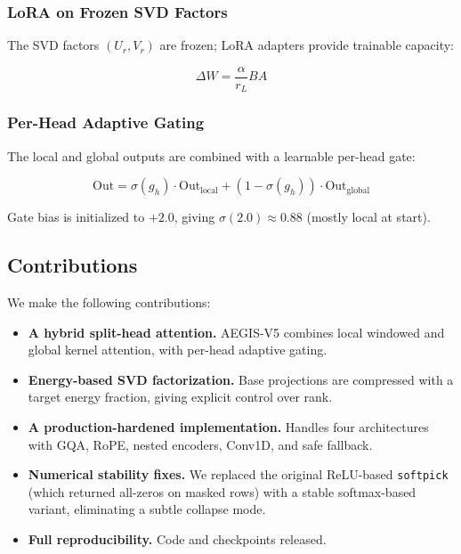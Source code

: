 \subsubsection{LoRA on Frozen SVD Factors}

The SVD factors $(U_r, V_r)$ are frozen; LoRA adapters provide trainable 
capacity:

\begin{equation}
\Delta W = \frac{\alpha}{r_L} B A
\end{equation}

\subsubsection{Per-Head Adaptive Gating}

The local and global outputs are combined with a learnable per-head gate:

\begin{equation}
\text{Out} = \sigma(g_h) \cdot \text{Out}_\text{local} + (1 - \sigma(g_h)) \cdot \text{Out}_\text{global}
\end{equation}

Gate bias is initialized to $+2.0$, giving $\sigma(2.0) \approx 0.88$ 
(mostly local at start).

\subsection{Contributions}

We make the following contributions:

\begin{itemize}
\item \textbf{A hybrid split-head attention.} AEGIS-V5 combines local windowed and
  global kernel attention, with per-head adaptive gating.
\item \textbf{Energy-based SVD factorization.} Base projections are compressed with
  a target energy fraction, giving explicit control over rank.
\item \textbf{A production-hardened implementation.} Handles four architectures with
  GQA, RoPE, nested encoders, Conv1D, and safe fallback.
\item \textbf{Numerical stability fixes.} We replaced the original ReLU-based \texttt{softpick}
  (which returned all-zeros on masked rows) with a stable softmax-based
  variant, eliminating a subtle collapse mode.
\item \textbf{Full reproducibility.} Code and checkpoints released.

\end{itemize}
